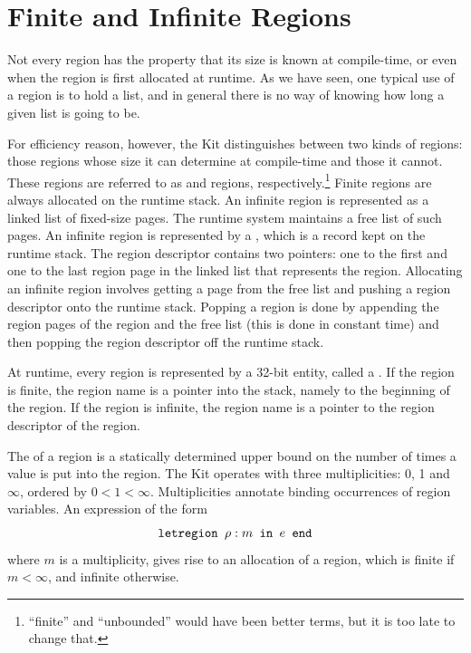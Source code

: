 \documentclass[12pt]{book}
\begin{document}
\section{Finite and Infinite Regions}
\label{fininf.sec}
Not every region has the property that its size is known at compile-time, 
or even when the region is first allocated at runtime. 
As we have seen, one typical use of a region is to hold
a list, and in general there is no way of knowing how long a given list
is going to be. 


For efficiency reason, however, the Kit distinguishes 
between two kinds of regions: those regions whose
size it can determine at compile-time and those it cannot. 
These regions are referred to as  and 
 regions, 
respectively.\footnote{``finite'' and ``unbounded'' would have been better
terms, but it is too late to change that.}
Finite regions are always 
allocated on the runtime stack.
An infinite region is represented as a linked list of fixed-size pages.
The runtime system maintains a free list of such pages. An infinite region
is represented by a , which is a record kept on
the runtime stack. The region descriptor contains two pointers: one to
the first and one to the last region page in the linked list that
represents the region. Allocating an infinite region involves getting a
page from the free list and pushing a region descriptor 
onto the runtime
stack. Popping a region is done by appending the region pages of the
region and the free list (this is done in constant time) and then popping
the region descriptor off the runtime stack.

At runtime, every region is represented by a 32-bit entity, called
a . If the region is finite, the
region name is a pointer into the stack, namely to the beginning of the
region. If the region is infinite, the region name is a pointer to
the region descriptor of the region. 

The  of a region is a statically determined upper
bound on the number of times a value is put into the region. The Kit
operates with three multiplicities: 0, 1 and $\infty$, ordered
by $0<1<\infty$. Multiplicities annotate
binding occurrences of region variables. An expression of the form
$$\hbox{\tt letregion $\rho:m$ in $e$ end}$$
where $m$ is a multiplicity,
gives rise to an allocation of a region, which is finite if $m<\infty$, and
infinite otherwise.
\end{document}
